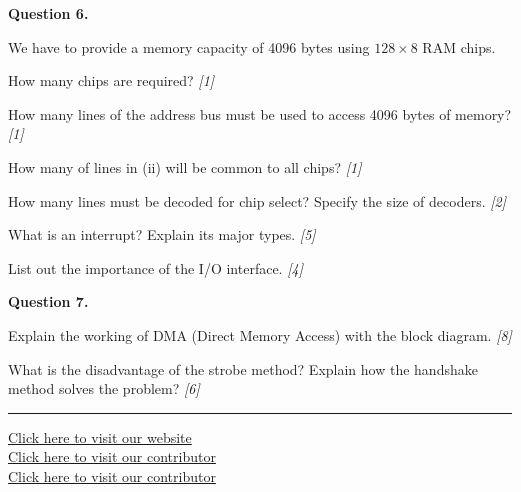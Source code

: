 \documentclass[11pt,a4paper]{article}
\newcommand{\pts}[1]{\hfill   \textit{[#1]}}
\begin{document}
\medskip


\noindent   \textbf{Question 6.}

\begin{parts}
  \item We have to provide a memory capacity of 4096 bytes using $128  \times 8$ RAM chips.
  
\begin{parts}
    \item How many chips are required? \pts{1}
    \item How many lines of the address bus must be used to access 4096 bytes of memory? \pts{1}
    \item How many of lines in (ii) will be common to all chips? \pts{1}
    \item How many lines must be decoded for chip select? Specify the size of decoders. \pts{2}
  \end{parts}
  \item What is an interrupt? Explain its major types. \pts{5}
  \item List out the importance of the I/O interface. \pts{4}
\end{parts}

\medskip


\noindent   \textbf{Question 7.}

\begin{parts}
  \item Explain the working of DMA (Direct Memory Access) with the block diagram. \pts{8}
  \item What is the disadvantage of the strobe method? Explain how the handshake method solves the problem? \pts{6}
\end{parts}

\vfill
\rule{\linewidth}{0.4pt}

\begin{center}\small
\href{https://bhu-exam.vercel.app/}{Click here to visit our website}\\[4pt]\href{https://me-aryan.vercel.app/}{Click here to visit our contributor}\\[4pt]\href{https://quashan-me.vercel.app/}{Click here to visit our contributor}
\end{center}
\end{document}

